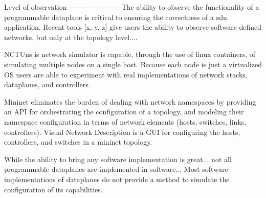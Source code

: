 Level of observation
---------------------
The ability to observe the functionality of a programmable dataplane is 
critical to ensuring the correctness of a sdn application. 
Recent tools [x, y, z] give users the ability to observe software defined
networks, but only at the topology level....  

NCTUns \cite{nctuns} is network simulator is capable, through the use of linux
containers, of simulating multiple nodes on a single host. Because each 
node is just a virtualized OS users are able to experiment with real 
implementations of network stacks, dataplanes, and controllers. 

Mininet \cite{mininet} eliminates the burden of dealing with network namespaces 
by providing an API for orchestrating the configuration of a topology, and 
modeling their namespace configuration in terms of network elements (hosts, 
switches, links, controllers). Visual Network Description \cite{vnd} is a 
GUI for configuring the hosts, controllers, and switches in a mininet
topology.

While the ability to bring any software implementation is great... not all
programmable dataplanes are implemented in software... Most software
implementations of dataplanes do not provide a method to simulate
the configuration of its capabilities.  
